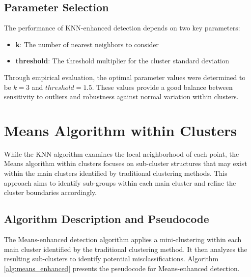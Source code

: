 \subsection{Parameter Selection}

The performance of KNN-enhanced detection depends on two key parameters:
\begin{itemize}
    \item \textbf{k}: The number of nearest neighbors to consider
    \item \textbf{threshold}: The threshold multiplier for the cluster standard deviation
\end{itemize}

Through empirical evaluation, the optimal parameter values were determined to be $k=3$ and $threshold=1.5$. These values provide a good balance between sensitivity to outliers and robustness against normal variation within clusters.

\section{Means Algorithm within Clusters}

While the KNN algorithm examines the local neighborhood of each point, the Means algorithm within clusters focuses on sub-cluster structures that may exist within the main clusters identified by traditional clustering methods. This approach aims to identify sub-groups within each main cluster and refine the cluster boundaries accordingly.

\subsection{Algorithm Description and Pseudocode}

The Means-enhanced detection algorithm applies a mini-clustering within each main cluster identified by the traditional clustering method. It then analyzes the resulting sub-clusters to identify potential misclassifications. Algorithm \ref{alg:means_enhanced} presents the pseudocode for Means-enhanced detection.

